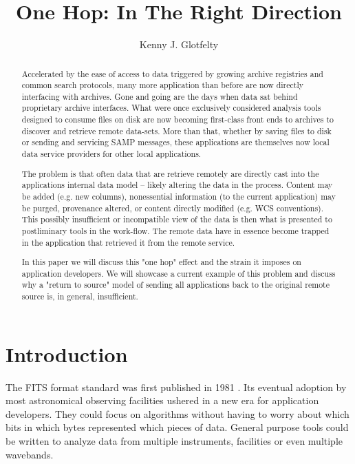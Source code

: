 
\resetcounters





\title{One Hop: In The Right Direction} \author{Kenny J. Glotfelty}

\begin{abstract}
Accelerated by the ease of access to data triggered by growing archive
registries and common search protocols, many more application than
before are now directly interfacing with archives.  Gone and going are
the days when data sat behind proprietary archive interfaces.  What were
once exclusively considered analysis tools designed to consume files
on disk are now becoming first-class front ends to archives to discover
and retrieve remote data-sets.  More than that, whether by saving files
to disk or sending and servicing SAMP messages, these applications are
themselves now local data service providers for other local applications.

The problem is that often data that are retrieve remotely are directly
cast into the applications internal data model -- likely altering
the data in the process.  Content may be added (e.g. new columns),
nonessential information (to the current application) may be purged,
provenance altered, or content directly modified (e.g. WCS conventions).
This possibly insufficient or incompatible view of the  data is then
what is presented to postliminary tools in the work-flow. The remote
data have in essence become trapped in the application that retrieved
it from the remote service.

In this paper we will discuss this "one hop" effect and the strain
it imposes on application developers.  We will showcase a current
example of this problem and discuss why a "return to source" model
of sending all applications back to the original remote source is,
in general, insufficient.
\end{abstract}

\section{Introduction}

The FITS format standard was first published in 
1981 \citep{1981A&AS...44..363W}.  Its eventual
adoption by most astronomical observing facilities ushered in a new era for
application developers.  They could focus on algorithms without having to
worry about which bits in which bytes represented which pieces of data.
General purpose tools could be written to analyze data from multiple
instruments, facilities or even multiple wavebands.

